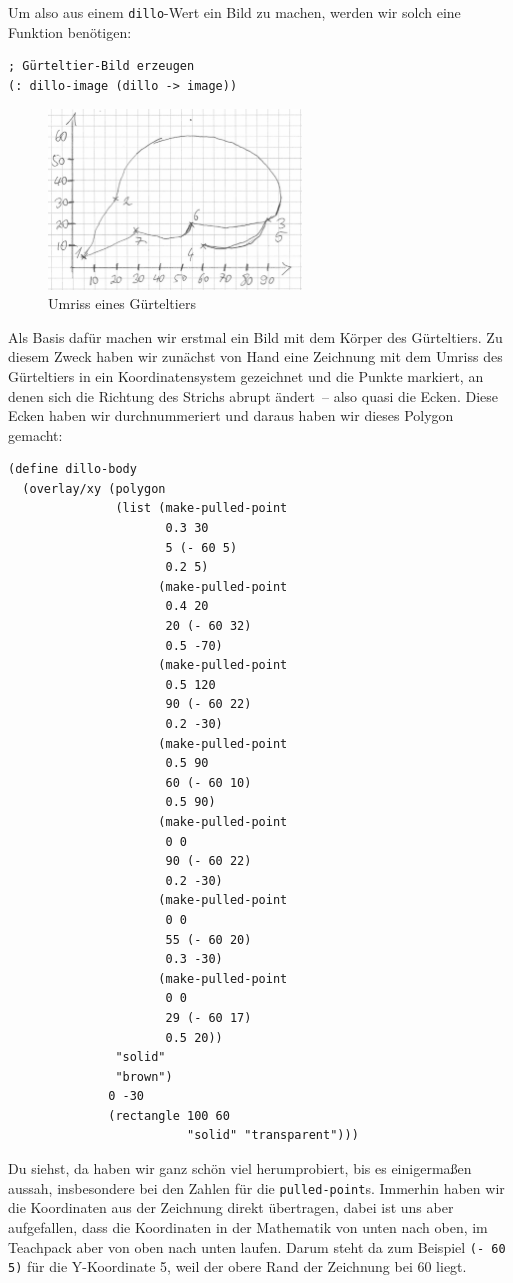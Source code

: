 Um also aus einem \lstinline{dillo}-Wert ein Bild zu machen, werden
wir solch eine Funktion benötigen:
%
\begin{lstlisting}
; Gürteltier-Bild erzeugen
(: dillo-image (dillo -> image))
\end{lstlisting}
%
\begin{figure}[tb]
  \centering
  \includegraphics[width=0.6\textwidth]{videospiele/dillo}
  \caption{Umriss eines Gürteltiers}
  \label{fig:dillo-body}
\end{figure}
Als Basis dafür machen wir erstmal ein Bild mit dem Körper des
Gürteltiers.  Zu diesem Zweck haben wir zunächst von Hand eine
Zeichnung mit dem Umriss des Gürteltiers in ein Koordinatensystem
gezeichnet und die Punkte markiert, an denen sich die Richtung des
Strichs abrupt ändert~-- also quasi die Ecken.  Diese Ecken haben wir
durchnummeriert und daraus haben wir dieses Polygon gemacht:
%
\begin{lstlisting}
(define dillo-body
  (overlay/xy (polygon
               (list (make-pulled-point
                      0.3 30
                      5 (- 60 5)
                      0.2 5)
                     (make-pulled-point
                      0.4 20
                      20 (- 60 32)
                      0.5 -70)
                     (make-pulled-point
                      0.5 120 
                      90 (- 60 22)
                      0.2 -30)
                     (make-pulled-point
                      0.5 90
                      60 (- 60 10)
                      0.5 90)
                     (make-pulled-point
                      0 0 
                      90 (- 60 22)
                      0.2 -30)
                     (make-pulled-point
                      0 0
                      55 (- 60 20)
                      0.3 -30)
                     (make-pulled-point
                      0 0
                      29 (- 60 17)
                      0.5 20))
               "solid"
               "brown")
              0 -30
              (rectangle 100 60
                         "solid" "transparent")))
\end{lstlisting}
%
Du siehst, da haben wir ganz schön viel herumprobiert, bis es
einigermaßen aussah, insbesondere bei den Zahlen für die
\lstinline{pulled-point}s.  Immerhin haben wir die Koordinaten aus der
Zeichnung direkt übertragen, dabei ist uns aber aufgefallen, dass die
Koordinaten in der Mathematik von unten nach oben, im Teachpack aber
von oben nach unten laufen.  Darum steht da zum Beispiel
\lstinline{(- 60 5)} für die Y-Koordinate 5, weil der obere Rand der
Zeichnung bei 60 liegt.

